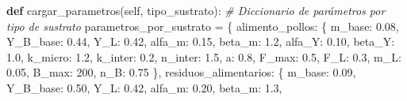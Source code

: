 \documentclass[
]{article}
\newenvironment{Shaded}{}{}
\newcommand{\CommentTok}[1]{\textcolor[rgb]{0.38,0.63,0.69}{\textit{#1}}}
\newcommand{\DecValTok}[1]{\textcolor[rgb]{0.25,0.63,0.44}{#1}}
\newcommand{\FloatTok}[1]{\textcolor[rgb]{0.25,0.63,0.44}{#1}}
\newcommand{\KeywordTok}[1]{\textcolor[rgb]{0.00,0.44,0.13}{\textbf{#1}}}
\newcommand{\NormalTok}[1]{#1}
\newcommand{\OperatorTok}[1]{\textcolor[rgb]{0.40,0.40,0.40}{#1}}
\newcommand{\StringTok}[1]{\textcolor[rgb]{0.25,0.44,0.63}{#1}}
\newcommand{\VariableTok}[1]{\textcolor[rgb]{0.10,0.09,0.49}{#1}}
\begin{document}
\begin{Shaded}
\begin{Highlighting}[]
    \KeywordTok{def}\NormalTok{ cargar\_parametros(}\VariableTok{self}\NormalTok{, tipo\_sustrato):}
        \CommentTok{\# Diccionario de parámetros por tipo de sustrato}
\NormalTok{        parametros\_por\_sustrato }\OperatorTok{=}\NormalTok{ \{}
            \StringTok{\textquotesingle{}alimento\_pollos\textquotesingle{}}\NormalTok{: \{}
                \StringTok{\textquotesingle{}m\_base\textquotesingle{}}\NormalTok{: }\FloatTok{0.08}\NormalTok{, }\StringTok{\textquotesingle{}Y\_B\_base\textquotesingle{}}\NormalTok{: }\FloatTok{0.44}\NormalTok{, }\StringTok{\textquotesingle{}Y\_L\textquotesingle{}}\NormalTok{: }\FloatTok{0.42}\NormalTok{,}
                \StringTok{\textquotesingle{}alfa\_m\textquotesingle{}}\NormalTok{: }\FloatTok{0.15}\NormalTok{, }\StringTok{\textquotesingle{}beta\_m\textquotesingle{}}\NormalTok{: }\FloatTok{1.2}\NormalTok{,}
                \StringTok{\textquotesingle{}alfa\_Y\textquotesingle{}}\NormalTok{: }\FloatTok{0.10}\NormalTok{, }\StringTok{\textquotesingle{}beta\_Y\textquotesingle{}}\NormalTok{: }\FloatTok{1.0}\NormalTok{,}
                \StringTok{\textquotesingle{}k\_micro\textquotesingle{}}\NormalTok{: }\FloatTok{1.2}\NormalTok{, }\StringTok{\textquotesingle{}k\_inter\textquotesingle{}}\NormalTok{: }\FloatTok{0.2}\NormalTok{, }\StringTok{\textquotesingle{}n\_inter\textquotesingle{}}\NormalTok{: }\FloatTok{1.5}\NormalTok{,}
                \StringTok{\textquotesingle{}a\textquotesingle{}}\NormalTok{: }\FloatTok{0.8}\NormalTok{, }\StringTok{\textquotesingle{}F\_max\textquotesingle{}}\NormalTok{: }\FloatTok{0.5}\NormalTok{, }\StringTok{\textquotesingle{}F\_L\textquotesingle{}}\NormalTok{: }\FloatTok{0.3}\NormalTok{, }\StringTok{\textquotesingle{}m\_L\textquotesingle{}}\NormalTok{: }\FloatTok{0.05}\NormalTok{,}
                \StringTok{\textquotesingle{}B\_max\textquotesingle{}}\NormalTok{: }\DecValTok{200}\NormalTok{, }\StringTok{\textquotesingle{}n\_B\textquotesingle{}}\NormalTok{: }\FloatTok{0.75}
\NormalTok{            \},}
            \StringTok{\textquotesingle{}residuos\_alimentarios\textquotesingle{}}\NormalTok{: \{}
                \StringTok{\textquotesingle{}m\_base\textquotesingle{}}\NormalTok{: }\FloatTok{0.09}\NormalTok{, }\StringTok{\textquotesingle{}Y\_B\_base\textquotesingle{}}\NormalTok{: }\FloatTok{0.50}\NormalTok{, }\StringTok{\textquotesingle{}Y\_L\textquotesingle{}}\NormalTok{: }\FloatTok{0.42}\NormalTok{,}
                \StringTok{\textquotesingle{}alfa\_m\textquotesingle{}}\NormalTok{: }\FloatTok{0.20}\NormalTok{, }\StringTok{\textquotesingle{}beta\_m\textquotesingle{}}\NormalTok{: }\FloatTok{1.3}\NormalTok{,}

\end{Highlighting}
\end{Shaded}
\end{document}
